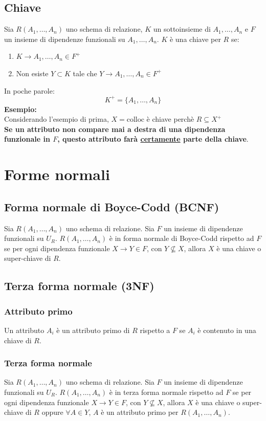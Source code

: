 \documentclass[12pt, a4paper]{report}
\begin{document}
    \subsection{Chiave}
    Sia $R(A_{1},\ldots,A_{n})$ uno schema di relazione, $K$ un sottoinsieme di $A_{1},\ldots,A_{n}$ e $F$ un insieme di dipendenze funzionali su $A_{1},\ldots,A_{n}$. $K$ è una chiave per $R$ se:
    \begin{enumerate}
        \item $K\rightarrow A_{1},\ldots,A_{n} \in F^{+}$
        \item Non esiste $Y\subset K$ tale che $Y\rightarrow A_{1},\ldots,A_{n} \in F^{+}$
    \end{enumerate}
    In poche parole:
    \begin{equation*}
        K^{+} = \{A_{1},\ldots,A_{n}\}
    \end{equation*}
    \textbf{Esempio:}\\
    Considerando l'esempio di prima, $X=\text{colloc}$ è chiave perchè $R\subseteq X^{+}$\\
    \textbf{Se un attributo non compare mai a destra di una dipendenza funzionale in $F$, questo attributo farà \underline{certamente} parte della chiave}.
    \section{Forme normali}
    \subsection{Forma normale di Boyce-Codd (BCNF)}
    Sia $R(A_{1},\ldots, A_{n})$ uno schema di relazione. Sia $F$ un insieme di dipendenze funzionali su $U_{R}$. $R(A_{1},\ldots, A_{n})$ è in forma normale di Boyce-Codd rispetto ad $F$ se per ogni dipendenza funzionale $X\rightarrow Y \in F$, con $Y \nsubseteq X$, allora $X$ è una chiave o super-chiave di $R$.
    \subsection{Terza forma normale (3NF)}
    \subsubsection{Attributo primo}
    Un attributo $A_{i}$ è un attributo primo di $R$ rispetto a $F$ se $A_{i}$ è contenuto in una chiave di $R$.
    \subsubsection{Terza forma normale}
    Sia $R(A_{1},\ldots, A_{n})$ uno schema di relazione. Sia $F$ un insieme di dipendenze funzionali su $U_{R}$. $R(A_{1},\ldots, A_{n})$ è in terza forma normale rispetto ad $F$ se per ogni dipendenza funzionale $X\rightarrow Y \in F$, con $Y \nsubseteq X$, allora $X$ è una chiave o super-chiave di $R$ oppure $\forall A \in Y$, $A$ è un attributo primo per $R(A_{1},\ldots, A_{n})$.
\end{document}
